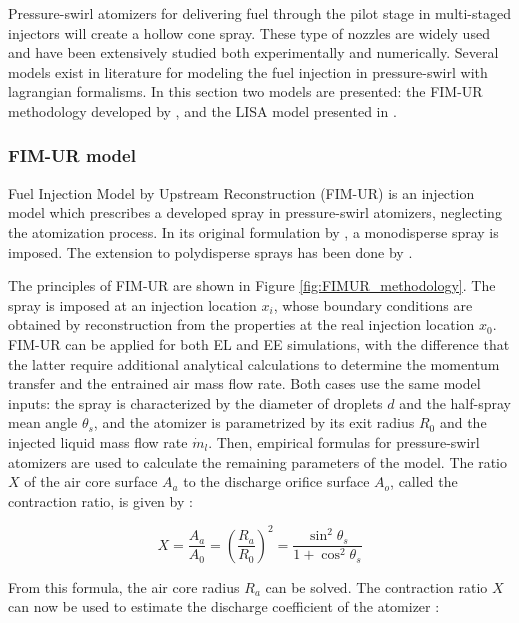 Pressure-swirl atomizers for delivering fuel through the pilot stage in multi-staged injectors will create a hollow cone spray. These type of nozzles are widely used and have been extensively studied both experimentally and numerically. Several models exist in literature for modeling the fuel injection in pressure-swirl with lagrangian formalisms. In this section two models are presented: the FIM-UR methodology developed by , and the LISA model presented in .


\subsubsection*{FIM-UR model}

Fuel Injection Model by Upstream Reconstruction (FIM-UR) is an injection model which prescribes a developed spray in pressure-swirl atomizers, neglecting the atomization process. In its original formulation by , a monodisperse spray is imposed. The extension to polydisperse sprays has been done by .

The principles of FIM-UR are shown in Figure \ref{fig:FIMUR_methodology}. The spray is imposed at an injection location $x_i$, whose boundary conditions are obtained by reconstruction from the properties at the real injection location $x_0$. FIM-UR can be applied for both EL and EE simulations, with the difference that the latter require additional analytical calculations to determine the momentum transfer and the entrained air mass flow rate. Both cases use the same model inputs: the spray is characterized by the diameter of droplets $d$ and the half-spray mean angle $\theta_s$, and the atomizer is parametrized by its exit radius $R_0$ and the injected liquid mass flow rate $\dot{m}_l$. Then, empirical formulas for pressure-swirl atomizers are used to calculate the remaining parameters of the model. The ratio $X$ of the air core surface $A_a$ to the discharge orifice surface $A_o$, called the contraction ratio, is given by :

\begin{equation}
X = \frac{A_a}{A_0} = \left( \frac{R_a}{R_0} \right)^2 = \frac{\sin^2 \theta_s}{1 + \cos^2 \theta_s}
\end{equation}

From this formula, the air core radius $R_a$ can be solved. The contraction ratio $X$ can now be used to estimate the discharge coefficient of the atomizer :

